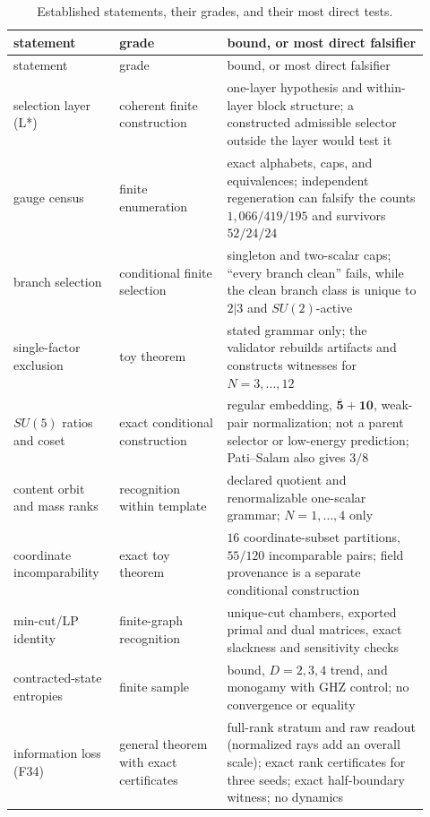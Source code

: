 \documentclass[11pt]{article}
\theoremstyle{definition}
\begin{document}
\begin{longtable}[]{@{}p{0.23\linewidth}p{0.24\linewidth}p{0.45\linewidth}@{}}
\caption{Established statements, their grades, and their most direct tests.}\label{tab:certified-scope}\\
\toprule
statement & grade & bound, or most direct falsifier\\
\midrule
\endfirsthead
\toprule
statement & grade & bound, or most direct falsifier\\
\midrule
\endhead
selection layer (L*) & coherent finite construction & one-layer hypothesis and within-layer block structure; a
constructed admissible selector outside the layer would test it\\
gauge census & finite enumeration & exact alphabets, caps, and equivalences; independent regeneration can falsify the
counts \(1{,}066/419/195\) and survivors \(52/24/24\)\\
branch selection & conditional finite selection & singleton and two-scalar caps; ``every branch clean'' fails, while the
clean branch class is unique to \(2|3\) and \(SU(2)\)-active\\
single-factor exclusion & toy theorem & stated grammar only; the validator rebuilds artifacts and constructs witnesses for
\(N=3,\dots,12\)\\
\(SU(5)\) ratios and coset & exact conditional construction & regular embedding, \(\overline{\mathbf5}+\mathbf{10}\),
weak-pair normalization; not a parent selector or low-energy prediction; Pati--Salam also gives \(3/8\)\\
content orbit and mass ranks & recognition within template & declared quotient and renormalizable one-scalar grammar;
\(N=1,\dots,4\) only\\
coordinate incomparability & exact toy theorem & \(16\) coordinate-subset partitions, \(55/120\) incomparable pairs;
field provenance is a separate conditional construction\\
min-cut/LP identity & finite-graph recognition & unique-cut chambers, exported primal and dual matrices, exact slackness
and sensitivity checks\\
contracted-state entropies & finite sample & bound, \(D=2,3,4\) trend, and monogamy with GHZ control; no convergence or
equality\\
information loss (F34) & general theorem with exact certificates & full-rank stratum and raw readout (normalized rays add
an overall scale); exact rank certificates for three seeds; exact half-boundary witness; no dynamics\\

\end{longtable}
\end{document}
